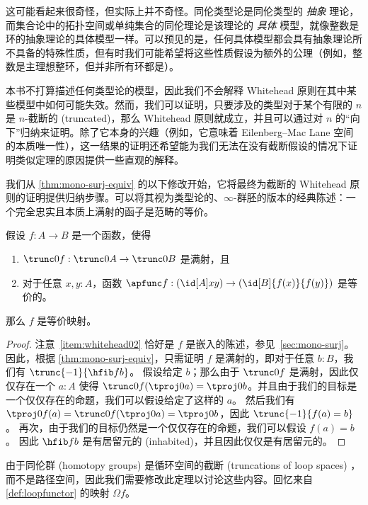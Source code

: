 {这可能看起来很奇怪，但实际上并不奇怪。同伦类型论是同伦类型的 \emph{抽象} 理论，而集合论中的拓扑空间或单纯集合的同伦理论是该理论的 \emph{具体} 模型，就像整数是环的抽象理论的具体模型一样。可以预见的是，任何具体模型都会具有抽象理论所不具备的特殊性质，但有时我们可能希望将这些性质假设为额外的公理（例如，整数是主理想整环，但并非所有环都是）。

本书不打算描述任何类型论的模型，因此我们不会解释 Whitehead 原则在其中某些模型中如何可能失效。然而，我们可以证明，只要涉及的类型对于某个有限的 $n$ 是 $n$-截断的 (truncated)，那么 Whitehead 原则就成立，并且可以通过对 $n$ 的“向下”归纳来证明。除了它本身的兴趣（例如，它意味着 Eilenberg--Mac Lane 空间的本质唯一性），这一结果的证明还希望能为我们无法在没有截断假设的情况下证明类似定理的原因提供一些直观的解释。

我们从 \cref{thm:mono-surj-equiv} 的以下修改开始，它将最终为截断的 Whitehead 原则的证明提供归纳步骤。可以将其视为类型论的、$\infty$-群胚的版本的经典陈述：一个完全忠实且本质上满射的函子是范畴的等价。

\begin{thm}\label{thm:whitehead0}
假设 $f:A\to B$ 是一个函数，使得
\begin{enumerate}
  \item $\trunc0 f : \trunc0 A \to \trunc0 B$ 是满射，且\label{item:whitehead01}
  \item 对于任意 $x,y:A$，函数 $\apfunc f : (\id[A]xy) \to (\id[B]{f(x)}{f(y)})$ 是等价的。\label{item:whitehead02}
\end{enumerate}
那么 $f$ 是等价映射。
\end{thm}
\begin{proof}
  注意~\ref{item:whitehead02} 恰好是 $f$ 是嵌入的陈述，参见~\cref{sec:mono-surj}。因此，根据 \cref{thm:mono-surj-equiv}，只需证明 $f$ 是满射的，即对于任意 $b:B$，我们有 $\trunc{-1}{\hfib f b}$。
  假设给定 $b$；那么由于 $\trunc0 f$ 是满射，因此仅仅存在一个 $a:A$ 使得 $\trunc 0 f(\tproj0a) = \tproj0b$。并且由于我们的目标是一个仅仅存在的命题，我们可以假设给定了这样的 $a$。
  然后我们有 $\tproj0{f(a)} = \trunc 0 f(\tproj0a) =\tproj0b$，因此 $\trunc{-1}{f(a)=b}$。
  再次，由于我们的目标仍然是一个仅仅存在的命题，我们可以假设 $f(a)=b$。
  因此 $\hfib f b$ 是有居留元的 (inhabited)，并且因此仅仅是有居留元的。
\end{proof}

由于同伦群 (homotopy groups) 是循环空间的截断 (truncations of loop spaces) ，而不是路径空间，因此我们需要修改此定理以讨论这些内容。回忆来自 \cref{def:loopfunctor} 的映射 $\Omega f$。

}
